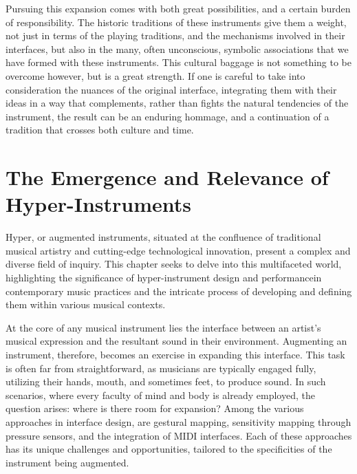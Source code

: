 \documentclass[12pt,twoside,maitrise]{dms}
\theoremstyle{definition}
\begin{document}
Pursuing this expansion comes with both great possibilities, and a certain burden of responsibility.
The historic traditions of these instruments give them a weight, not just in terms of the playing traditions, and the mechanisms involved in their interfaces, but also in the many, often unconscious, symbolic associations that we have formed with these instruments.
This cultural baggage is not something to be overcome however, but is a great strength.
If one is careful to take into consideration the nuances of the original interface, integrating them with their ideas in a way that complements, rather than fights the natural tendencies of the instrument, the result can be an enduring hommage, and a continuation of a tradition that crosses both culture and time.


\chapter{The Emergence and Relevance of Hyper-Instruments}

Hyper, or augmented instruments, situated at the confluence of traditional musical artistry and cutting-edge technological innovation, present a complex and diverse field of inquiry.
This chapter seeks to delve into this multifaceted world, highlighting the significance of hyper-instrument design and performancein contemporary music practices and the intricate process of developing and defining them within various musical contexts.

At the core of any musical instrument lies the interface between an artist's musical expression and the resultant sound in their environment.
Augmenting an instrument, therefore, becomes an exercise in expanding this interface.
This task is often far from straightforward, as musicians are typically engaged fully, utilizing their hands, mouth, and sometimes feet, to produce sound.
In such scenarios, where every faculty of mind and body is already employed, the question arises: where is there room for expansion?
Among the various approaches in interface design, are gestural mapping, sensitivity mapping through pressure sensors, and the integration of MIDI interfaces.
Each of these approaches has its unique challenges and opportunities, tailored to the specificities of the instrument being augmented.
\end{document}

